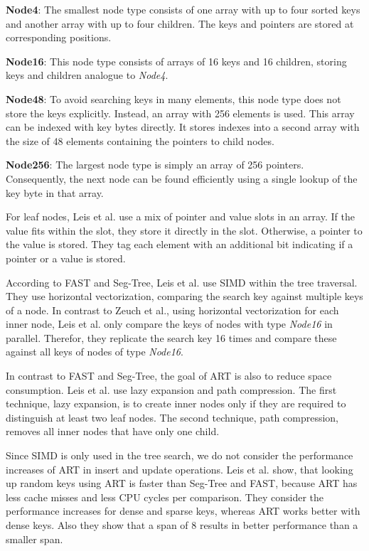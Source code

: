 \documentclass[conference]{IEEEtran}
\begin{document}
\textbf{Node4}: The smallest node type consists of one array with up to four sorted keys and another array with up to four children. The keys and pointers are stored at corresponding positions.

\textbf{Node16}: This node type consists of arrays of 16 keys and 16 children, storing keys and children analogue to \emph{Node4}.

\textbf{Node48}: To avoid searching keys in many elements, this node type does not store the keys explicitly. Instead, an array with 256 elements is used. This array can be indexed with key bytes directly. It stores indexes into a second array with the size of 48 elements containing the pointers to child nodes.

\textbf{Node256}: The largest node type is simply an array of 256 pointers. Consequently, the next node can be found efficiently using a single lookup of the key byte in that array. 

For leaf nodes, Leis et al. use a mix of pointer and value slots in an array. If the value fits within the slot, they store it directly in the slot. Otherwise, a pointer to the value is stored. They tag each element with an additional bit indicating if a pointer or a value is stored.

According to FAST and Seg-Tree, Leis et al. use SIMD within the tree traversal. They use horizontal vectorization, comparing the search key against multiple keys of a node. In contrast to Zeuch et al., using horizontal vectorization for each inner node, Leis et al. only compare the keys of nodes with type \emph{Node16} in parallel. Therefor, they replicate the search key 16 times and compare these against all keys of nodes of type \emph{Node16}.

In contrast to FAST and Seg-Tree, the goal of ART is also to reduce space consumption. Leis et al. use lazy expansion and path compression. The first technique, lazy expansion, is to create inner nodes only if they are required to distinguish at least two leaf nodes. The second technique, path compression, removes all inner nodes that have only one child.

Since SIMD is only used in the tree search, we do not consider the performance increases of ART in insert and update operations. Leis et al. show, that looking up random keys using ART is faster than Seg-Tree and FAST, because ART has less cache misses and less CPU cycles per comparison. They consider the performance increases for dense and sparse keys, whereas ART works better with dense keys. Also they show that a span of 8 results in better performance than a smaller span. 
\end{document}
